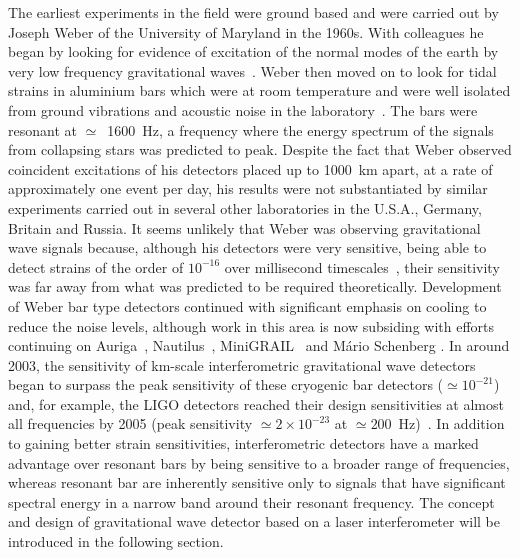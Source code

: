 \documentclass{article}
\begin{document}
The earliest experiments in the field were ground based and were carried out by
Joseph Weber of the University of Maryland in the 1960s. With colleagues
he began by looking for evidence of excitation of the normal modes of the earth
by very low frequency gravitational waves~\cite{Forward2}. Weber then moved on
to look for tidal strains in aluminium bars which were at room temperature and
were well isolated from ground vibrations and acoustic noise in the
laboratory~\cite{Weber1, Weber2}. The bars were resonant at $\simeq$~1600~Hz, a
frequency where the energy spectrum of the signals from collapsing stars was
predicted to peak. Despite the fact that Weber observed coincident excitations
of his detectors placed up to 1000~km apart, at a rate of approximately one
event per day, his results were not substantiated by similar experiments carried
out in several other laboratories in the U.S.A., Germany, Britain and Russia. It
seems unlikely that Weber was observing gravitational wave signals because,
although his detectors were very sensitive, being able to detect strains of the
order of $10^{-16}$ over millisecond timescales~\cite{Weber1}, their sensitivity was far away
from what was predicted to be required theoretically. Development of Weber bar
type detectors continued with significant emphasis on cooling to reduce the noise
levels, although work in this area is now subsiding with efforts continuing on Auriga~\cite{AURIGA}, Nautilus~\cite{NAUTILUS}, MiniGRAIL~\cite{MiniGRAIL, Gottardi:2007}
and M\'{a}rio Schenberg \cite{Schenberg, Aguiar:2006}.  In around 2003, the sensitivity of km-scale interferometric gravitational wave detectors began to surpass the peak sensitivity of these cryogenic bar detectors ($\simeq 10^{-21}$) and, for example, the LIGO detectors reached their design sensitivities at almost all frequencies by 2005 (peak sensitivity $\simeq 2\times10^{-23}$ at $\simeq200$~Hz)~\cite{Whitcomb:2008}.  In addition to gaining better strain sensitivities, interferometric detectors have a marked advantage over resonant bars by being sensitive to a broader range of frequencies, whereas resonant bar are inherently sensitive only to signals that have significant spectral energy in a narrow band around their resonant frequency. The concept and design of gravitational wave detector based on a laser interferometer will be introduced in the following section.


\end{document}

